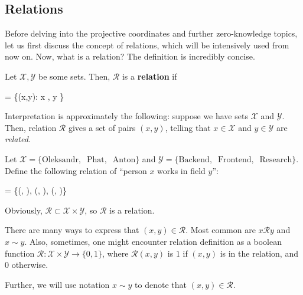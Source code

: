 \documentclass[../lecture-notes-148x210.tex]{subfiles}
\begin{document}
\subsection{Relations}\label{section:relations}

Before delving into the projective coordinates and further zero-knowledge topics, let us first discuss the concept of relations, which will be intensively used from now on. Now, what is a relation? The definition is incredibly concise.

\begin{definition}
    Let $\mathcal{X},\mathcal{Y}$ be some sets. Then, $\mathcal{R}$ is a \textbf{relation} if 
    \begin{xequation}
         \subset {} \times {} = \{(x,y): x \in {}, y \in {}\}
    \end{xequation}
\end{definition}

Interpretation is approximately the following: suppose we have sets $\mathcal{X}$ and $\mathcal{Y}$. Then, relation $\mathcal{R}$ gives a set of pairs $(x,y)$, telling that $x \in \mathcal{X}$ and $y \in \mathcal{Y}$ are \textit{related}.

\begin{example}
    Let $\mathcal{X} = \{\text{Oleksandr}, \;\; \text{Phat}, \;\; \text{Anton}\}$ and $\mathcal{Y} = \{\text{Backend}, \;\; \text{Frontend}, \;\; \text{Research}\}$. Define the following relation of ``person $x$ works in field $y$'':
    \begin{xequation*}
         = \{(, \;\; ), \;\; (, \;\; ), (, \;\; )\}
    \end{xequation*}
    Obviously, $\mathcal{R} \subset \mathcal{X} \times \mathcal{Y}$, so $\mathcal{R}$ is a relation.
\end{example}

\begin{remark}
    There are many ways to express that $(x,y) \in \mathcal{R}$. Most common are $x \mathcal{R} y$ and $x \sim y$. Also, sometimes, one might encounter relation definition as a boolean function $\mathcal{R}: \mathcal{X} \times \mathcal{Y} \to \{0,1\}$, where $\mathcal{R}(x,y)$ is $1$ if $(x,y)$ is in the relation, and $0$ otherwise.

    Further, we will use notation $x \sim y$ to denote that $(x,y) \in \mathcal{R}$.
\end{remark}
\end{document}
